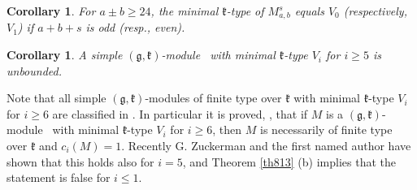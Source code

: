 \documentclass[12pt]{amsart}
\theoremstyle{plain} %
\newtheorem{corollary}[definition]{Corollary}
\newcommand{\kk}{\mathfrak{k}}
\renewcommand{\gg}{\mathfrak{g}}
\newcommand{\refth}[1]{Theorem \ref{#1}}
\newcommand {\gkm} {$(\gg,\kk)$-module}
\begin{document}
\begin{corollary}
For $a\pm b\geq 24$, the minimal $\kk$-type of $M_{a,b}^s$ equals $V_0$ (respectively, $V_1$) if $a+b+s$ is odd (resp., even).
\end{corollary}

\begin{corollary}
A simple \gkm~ with minimal $\kk$-type $V_i$ for $i\geq 5$ is unbounded.
\end{corollary}

Note that all simple \gkm s of finite type over $\kk$ with minimal $\kk$-type $V_i$ for $i\geq 6$ are classified in \cite{PZ2}. In particular it is proved, \cite{PZ2}, that if $M$ is a \gkm~ with minimal $\kk$-type $V_i$ for $i\geq 6$, then $M$ is necessarily of finite type over $\kk$ and $c_i(M)=1$. Recently G. Zuckerman and the first named author have shown that this holds also for $i=5$, and \refth{th813} (b) implies that the statement is false for $i\leq 1$.
\end{document}
